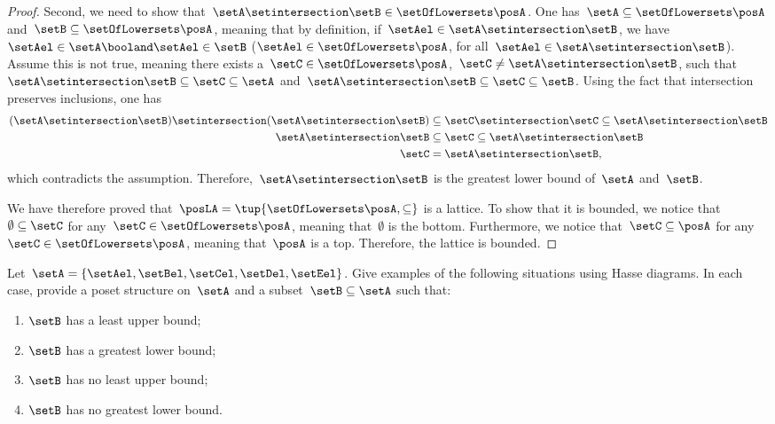 \begin{proof}
	Second, we need to show that~$\setA \setintersection \setB\in \setOfLowersets \posA$.
	One has~$\setA \subseteq \setOfLowersets \posA$ and~$\setB\subseteq \setOfLowersets \posA$, meaning that by definition, if~$\setAel\in \setA\setintersection \setB$, we have~$\setAel \in \setA\booland \setAel\in \setB$ ($\setAel\in \setOfLowersets \posA$, for all~$\setAel\in \setA \setintersection \setB$).
	Assume this is not true, meaning there exists a~$\setC\in \setOfLowersets \posA$,~$\setC\neq \setA\setintersection \setB$, such that~$\setA\setintersection \setB\subseteq \setC\subseteq \setA$ and~$\setA\setintersection \setB\subseteq \setC\subseteq \setB$.
	Using the fact that intersection preserves inclusions, one has
	\begin{equation}
		\begin{aligned}
			(\setA\setintersection \setB)
			\setintersection (\setA\setintersection \setB) & \subseteq \setC \setintersection \setC \subseteq \setA\setintersection \setB \\
			\setA\setintersection \setB        & \subseteq \setC\subseteq \setA\setintersection \setB             \\
			\setC                  & =\setA\setintersection \setB,
		\end{aligned}
	\end{equation}
	which contradicts the assumption.
	Therefore,~$\setA\setintersection \setB$ is the greatest lower bound of~$\setA$ and~$\setB$.

	We have therefore proved that~$\posLA=\tup{\setOfLowersets \posA,\subseteq}$ is a lattice.
	To show that it is bounded, we notice that~$\emptyset \subseteq \setC$ for any~$\setC\in \setOfLowersets \posA$, meaning that~$\emptyset$ is the bottom.
	Furthermore, we notice that~$\setC\subseteq \posA$ for any~$\setC\in \setOfLowersets \posA$, meaning that~$\posA$ is a top.
	Therefore, the lattice is bounded.
\end{proof}

\vfill

\begin{gradedexercise}
	\label{ex:UpperLowerBounds}
	Let~$\setA = \{\setAel, \setBel, \setCel, \setDel, \setEel \}$.
	Give examples of the following situations using Hasse diagrams.
	In each case, provide a poset structure on~$\setA$ and a subset~$\setB \subseteq \setA$ such that:
	\begin{enumerate}
		\item $\setB$ has a least upper bound;
		\item $\setB$ has a greatest lower bound;
		\item $\setB$ has no least upper bound;
		\item $\setB$ has no greatest lower bound.
	\end{enumerate}
\end{gradedexercise}


